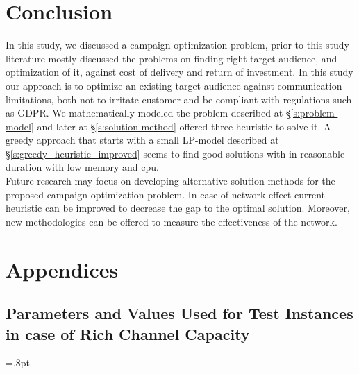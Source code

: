 \documentclass[11pt]{article}
\begin{document}
\section{Conclusion} \label{s:conclusion}
In this study, we discussed a campaign optimization problem, prior to this study literature mostly discussed the problems on finding right target audience, and optimization of it, against cost of delivery and return of investment. In this study our approach is to optimize an existing target audience against communication limitations, both not to irritate customer and be compliant with regulations such as GDPR. We mathematically modeled the problem described at \S \ref{s:problem-model} and later at \S \ref{s:solution-method} offered three heuristic to solve it. A greedy approach that starts with a small LP-model described at \S \ref{s:greedy_heuristic_improved} seems to find good solutions with-in reasonable duration with low memory and cpu.\\
Future research may focus on developing alternative solution methods for the proposed campaign optimization problem. In case of network effect current heuristic can be improved to decrease the gap to the optimal solution. Moreover, new methodologies can be offered to measure the effectiveness of the network.
\newpage

\newpage

\appendix

\section{Appendices}

\subsection{Parameters and Values Used for Test Instances in case of Rich Channel Capacity}\label{s:apendix-parameters-in-test-instances}

\arraycolsep=.8pt\def\arraystretch{.8}
\tiny  %
\setlength\LTleft{-30pt}            %
\setlength\LTright{-30pt}           %
\end{document}

